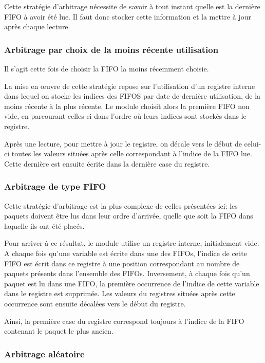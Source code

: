Cette stratégie d'arbitrage nécessite de savoir à tout instant quelle est la
dernière FIFO à avoir été lue. Il faut donc stocker cette information et la
mettre à jour après chaque lecture.

\subsubsection{Arbitrage par choix de la moins récente utilisation}

Il s'agit cette fois de choisir la FIFO la moins récemment choisie.

La mise en œuvre de cette stratégie repose sur l'utilisation d'un registre
interne dans lequel on stocke les indices des FIFOS par date de dernière
utilisation, de la moins récente à la plus récente. Le module  choisit alors la
première FIFO non vide, en parcourant celles-ci dans l'ordre où leurs indices
sont stockés dans le registre.

Après une lecture, pour mettre à jour le registre, on décale vers le début de
celui-ci toutes les valeurs situées après celle correspondant à l'indice de la
FIFO lue. Cette dernière est ensuite écrite dans la dernière case du registre.

\subsubsection{Arbitrage de type FIFO}

Cette stratégie d'arbitrage est la plus complexe de celles présentées ici: les
paquets doivent être lus dans leur ordre d'arrivée, quelle que soit la FIFO dans
laquelle ils ont été placés.

Pour arriver à ce résultat, le module utilise un registre interne, initialement
vide. A chaque fois qu'une variable est écrite dans une des FIFOs, l'indice de
cette FIFO est écrit dans ce registre à une position correspondant au nombre de
paquets présents dans l'ensemble des FIFOs. Inversement, à chaque fois qu'un
paquet est lu dans une FIFO, la première occurrence de l'indice de cette variable
dans le registre est supprimée. Les valeurs du registres situées après cette
occurrence sont ensuite décalées vers le début du registre.

Ainsi, la première case du registre correspond toujours à l'indice de la FIFO
contenant le paquet le plus ancien.

\subsubsection{Arbitrage aléatoire}

